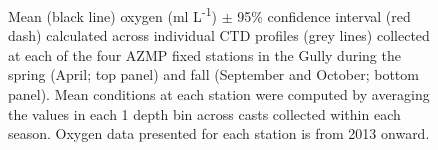 \documentclass[12pt]{article}\usepackage[]{graphicx}\usepackage[]{color}
\begin{document}
\begin{landscapepage}
\begin{figure}[htb]

{\centering {} 

}

\caption{Mean (black line) oxygen (ml L\textsuperscript{-1}) \(\pm\) 95\% confidence interval (red dash) calculated across individual CTD profiles (grey lines) collected at each of the four AZMP fixed stations in the Gully during the spring (April; top panel) and fall (September and October; bottom panel). Mean conditions at each station were computed by averaging the values in each 1 depth bin across casts collected within each season. Oxygen data presented for each station is from 2013 onward.}\label{fig:figure7}
\end{figure}
\end{landscapepage}
\clearpage
\end{document}
